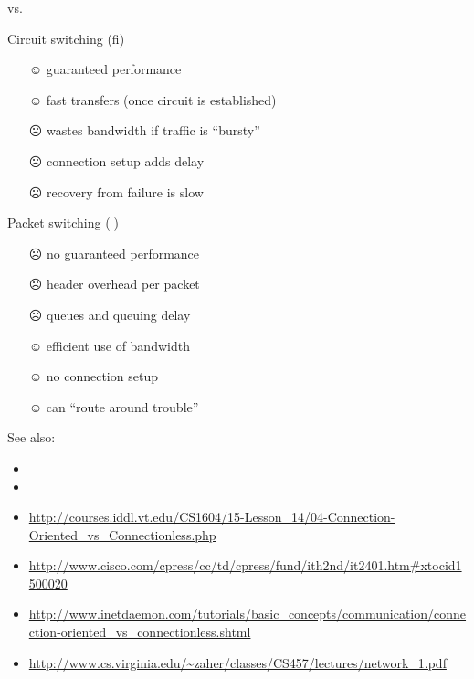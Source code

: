 \begin{frame}{\scalebox{2}{ﬁ}\quad vs.\quad\scalebox{2}{}}
  \begin{minipage}[t]{.47\linewidth}
    \begin{iblock}{Circuit switching (ﬁ)}
      \begin{itemize}
      \item[☺] guaranteed performance
      \item[☺] fast transfers (once circuit is established)
      \item[\alert{☹}] wastes bandwidth if traffic is ``bursty''
      \item[\alert{☹}] connection setup adds delay
      \item[\alert{☹}] recovery from failure is slow
      \end{itemize}
    \end{iblock}
  \end{minipage}\hfill
  \begin{minipage}[t]{.47\linewidth}
    \begin{iblock}{Packet switching ()}
      \begin{itemize}
      \item[\alert{☹}] no guaranteed performance
      \item[\alert{☹}] header overhead per packet
      \item[\alert{☹}] queues and queuing delay
      \item[☺] efficient use of bandwidth
      \item[☺] no connection setup
      \item[☺] can ``route around trouble''
      \end{itemize}
    \end{iblock}
  \end{minipage}
\end{frame}

See also:
\begin{itemize}
\item {}
\item {}
\item
  \url{http://courses.iddl.vt.edu/CS1604/15-Lesson_14/04-Connection-Oriented_vs_Connectionless.php}
\item \url{http://www.cisco.com/cpress/cc/td/cpress/fund/ith2nd/it2401.htm#xtocid1500020}
\item
  \url{http://www.inetdaemon.com/tutorials/basic_concepts/communication/connection-oriented_vs_connectionless.shtml}
\item \url{http://www.cs.virginia.edu/~zaher/classes/CS457/lectures/network_1.pdf}
\end{itemize}

